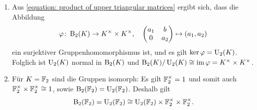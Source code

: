 \begin{solution}
\begin{enumerate}
    \item
      Aus \eqref{equation: product of upper triangular matrices} ergibt sich, dass die Abbildung
      \[
                \varphi
        \colon  \operatorname{B}_2(K) \to K^\times \times K^\times,
        \quad   \begin{pmatrix}
                  a_1 & b   \\
                  0   & a_2
                \end{pmatrix}
                \mapsto
                (a_1, a_2)
      \]
      ein surjektiver Gruppenhomomorphismus ist, und es gilt $\ker \varphi = \operatorname{U}_2(K)$.
      Folglich ist $\operatorname{U}_2(K)$ normal in $\operatorname{B}_2(K)$ und $\operatorname{B}_2(K) / \operatorname{U}_2(K) \cong \operatorname{im} \varphi = K^\times \times K^\times$.
    
    \item
      Für $K = \mathbb{F}_2$ sind die Gruppen isomorph:
      Es gilt $\mathbb{F}_2^\times = 1$ und somit auch $\mathbb{F}_2^\times \times \mathbb{F}_2^\times \cong 1$, sowie $\operatorname{B}_2(\mathbb{F}_2) = \operatorname{U}_2(\mathbb{F}_2)$.
      Deshalb gilt
      \[
              \operatorname{B}_2(\mathbb{F}_2)
        =     \operatorname{U}_2(\mathbb{F}_2)
        \cong \operatorname{U}_2(\mathbb{F}_2) \times \mathbb{F}_2^\times \times \mathbb{F}_2^\times.
      \]
      

\end{enumerate}
\end{solution}
